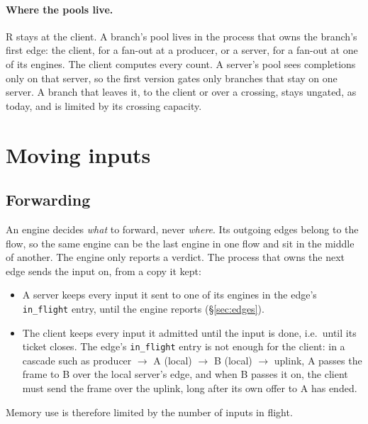\documentclass[11pt]{article}
\newcommand{\code}[1]{\texttt{#1}}
\begin{document}
\paragraph{Where the pools live.} R stays at the client. A branch's pool
lives in the process that owns the branch's first edge: the client, for a
fan-out at a producer, or a server, for a fan-out at one of its engines. The
client computes every count. A server's pool sees completions only on that
server, so the first version gates only branches that stay on one server. A
branch that leaves it, to the client or over a crossing, stays ungated, as
today, and is limited by its crossing capacity.

\section{Moving inputs}
\label{sec:moving}

\subsection{Forwarding}
\label{sec:forwarding}

An engine decides \emph{what} to forward, never \emph{where}. Its outgoing
edges belong to the flow, so the same engine can be the last engine in one
flow and sit in the middle of another. The engine only reports a verdict. The
process that owns the next edge sends the input on, from a copy it kept:
\begin{itemize}[nosep]
  \item A server keeps every input it sent to one of its engines in the
        edge's \code{in\_flight} entry, until the engine reports
        (\S\ref{sec:edges}).
  \item The client keeps every input it admitted until the input is done,
        i.e.\ until its ticket closes. The edge's \code{in\_flight} entry is
        not enough for the client: in a cascade such as producer $\to$ A
        (local) $\to$ B (local) $\to$ uplink, A passes the frame to B over the
        local server's edge, and when B passes it on, the client must send the
        frame over the uplink, long after its own offer to A has ended.
\end{itemize}
Memory use is therefore limited by the number of inputs in flight.
\end{document}
